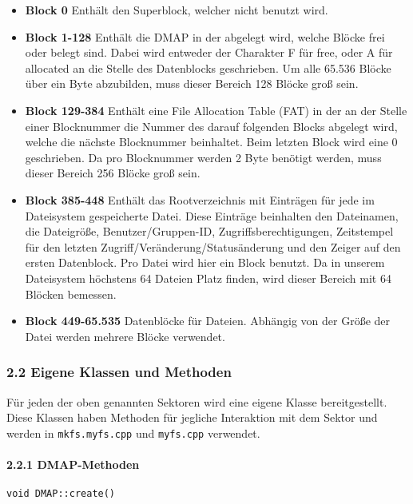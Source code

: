 \documentclass[]{article}
\let\oldparagraph\paragraph
\renewcommand{\paragraph}[1]{\oldparagraph{#1}\mbox{}}
\begin{document}
\begin{itemize}
\item
  \textbf{Block 0} Enthält den Superblock, welcher nicht benutzt wird.
\item
  \textbf{Block 1-128} Enthält die DMAP in der abgelegt wird, welche
  Blöcke frei oder belegt sind. Dabei wird entweder der Charakter F für
  free, oder A für allocated an die Stelle des Datenblocks geschrieben.
  Um alle 65.536 Blöcke über ein Byte abzubilden, muss dieser Bereich
  128 Blöcke groß sein.
\item
  \textbf{Block 129-384} Enthält eine File Allocation Table (FAT) in der
  an der Stelle einer Blocknummer die Nummer des darauf folgenden Blocks
  abgelegt wird, welche die nächste Blocknummer beinhaltet. Beim letzten
  Block wird eine 0 geschrieben. Da pro Blocknummer werden 2 Byte
  benötigt werden, muss dieser Bereich 256 Blöcke groß sein.
\item
  \textbf{Block 385-448} Enthält das Rootverzeichnis mit Einträgen für
  jede im Dateisystem gespeicherte Datei. Diese Einträge beinhalten den
  Dateinamen, die Dateigröße, Benutzer/Gruppen-ID,
  Zugriffsberechtigungen, Zeitstempel für den letzten
  Zugriff/Veränderung/Statusänderung und den Zeiger auf den ersten
  Datenblock. Pro Datei wird hier ein Block benutzt. Da in unserem
  Dateisystem höchstens 64 Dateien Platz finden, wird dieser Bereich mit
  64 Blöcken bemessen.
\item
  \textbf{Block 449-65.535} Datenblöcke für Dateien. Abhängig von der
  Größe der Datei werden mehrere Blöcke verwendet.
\end{itemize}

\hypertarget{eigene-klassen-und-methoden}{%
\subsubsection{2.2 Eigene Klassen und
Methoden}\label{eigene-klassen-und-methoden}}

Für jeden der oben genannten Sektoren wird eine eigene Klasse
bereitgestellt. Diese Klassen haben Methoden für jegliche Interaktion
mit dem Sektor und werden in \texttt{mkfs.myfs.cpp} und
\texttt{myfs.cpp} verwendet.

\hypertarget{dmap-methoden}{%
\paragraph{2.2.1 DMAP-Methoden}\label{dmap-methoden}}

\texttt{void\ DMAP::create()}
\end{document}
